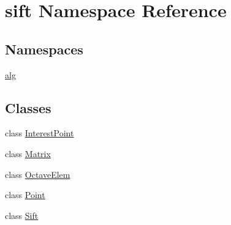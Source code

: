 \hypertarget{namespacesift}{}\section{sift Namespace Reference}
\label{namespacesift}
\subsection*{Namespaces}
\begin{DoxyCompactItemize}
\item 
 \hyperlink{namespacesift_1_1alg}{alg}
\end{DoxyCompactItemize}
\subsection*{Classes}
\begin{DoxyCompactItemize}
\item 
class \hyperlink{classsift_1_1InterestPoint}{Interest\+Point}
\item 
class \hyperlink{classsift_1_1Matrix}{Matrix}
\item 
class \hyperlink{classsift_1_1OctaveElem}{Octave\+Elem}
\item 
class \hyperlink{classsift_1_1Point}{Point}
\item 
class \hyperlink{classsift_1_1Sift}{Sift}
\end{DoxyCompactItemize}
